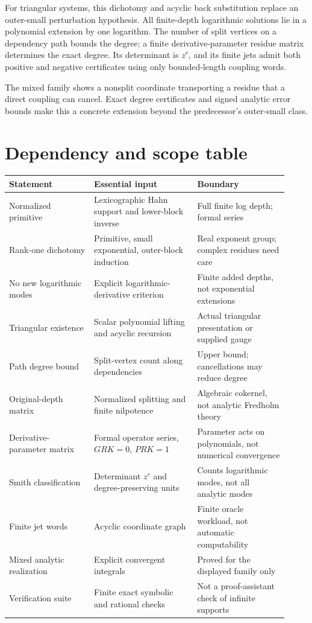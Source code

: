 \documentclass[11pt,a4paper]{article}
\numberwithin{equation}{section}
\theoremstyle{definition}
\theoremstyle{remark}\newtheorem{remark}[theorem]{Remark}
\begin{document}
For triangular systems, this dichotomy and acyclic back substitution replace an outer-small perturbation hypothesis. All finite-depth logarithmic solutions lie in a polynomial extension by one logarithm. The number of split vertices on a dependency path bounds the degree; a finite derivative-parameter residue matrix determines the exact degree. Its determinant is $z^r$, and its finite jets admit both positive and negative certificates using only bounded-length coupling words.

The mixed family shows a nonsplit coordinate transporting a residue that a direct coupling can cancel. Exact degree certificates and signed analytic error bounds make this a concrete extension beyond the predecessor's outer-small class.

\appendix
\section{Dependency and scope table}
\begin{longtable}{>{\raggedright\arraybackslash}p{0.28\linewidth}>{\raggedright\arraybackslash}p{0.34\linewidth}>{\raggedright\arraybackslash}p{0.30\linewidth}}
\toprule
Statement & Essential input & Boundary\\
\midrule\endhead
Normalized primitive & Lexicographic Hahn support and lower-block inverse & Full finite log depth; formal series\\
Rank-one dichotomy & Primitive, small exponential, outer-block induction & Real exponent group; complex residues need care\\
No new logarithmic modes & Explicit logarithmic-derivative criterion & Finite added depths, not exponential extensions\\
Triangular existence & Scalar polynomial lifting and acyclic recursion & Actual triangular presentation or supplied gauge\\
Path degree bound & Split-vertex count along dependencies & Upper bound; cancellations may reduce degree\\
Original-depth matrix & Normalized splitting and finite nilpotence & Algebraic cokernel, not analytic Fredholm theory\\
Derivative-parameter matrix & Formal operator series, $GRK=0$, $PRK=1$ & Parameter acts on polynomials, not numerical convergence\\
Smith classification & Determinant $z^r$ and degree-preserving units & Counts logarithmic modes, not all analytic modes\\
Finite jet words & Acyclic coordinate graph & Finite oracle workload, not automatic computability\\
Mixed analytic realization & Explicit convergent integrals & Proved for the displayed family only\\
Verification suite & Finite exact symbolic and rational checks & Not a proof-assistant check of infinite supports\\
\bottomrule
\end{longtable}
\end{document}
